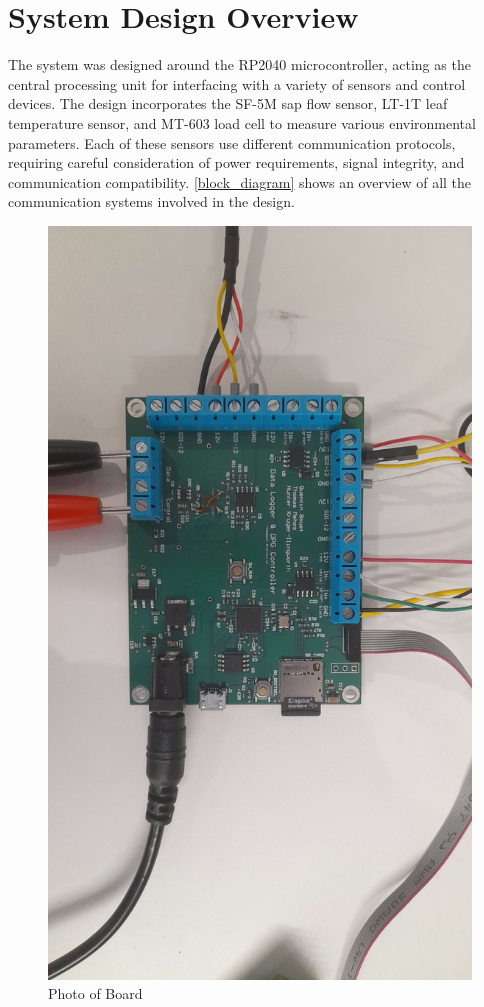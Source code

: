 
\section{System Design Overview}

The system was designed around the RP2040 microcontroller, acting as the central 
processing unit for interfacing with a variety of sensors and control devices. 
The design incorporates the SF-5M sap flow sensor, LT-1T leaf temperature sensor, 
and MT-603 load cell to measure various environmental parameters. Each of these 
sensors use different communication protocols, requiring careful consideration of 
power requirements, signal integrity, and communication compatibility. \cref{block_diagram} 
shows an overview of all the communication systems involved in the design.

\begin{figure}
    \includegraphics[width=\linewidth]{figures/board_photo.jpg}
    \caption{Photo of Board}
    \label{board_photo}
\end{figure}


